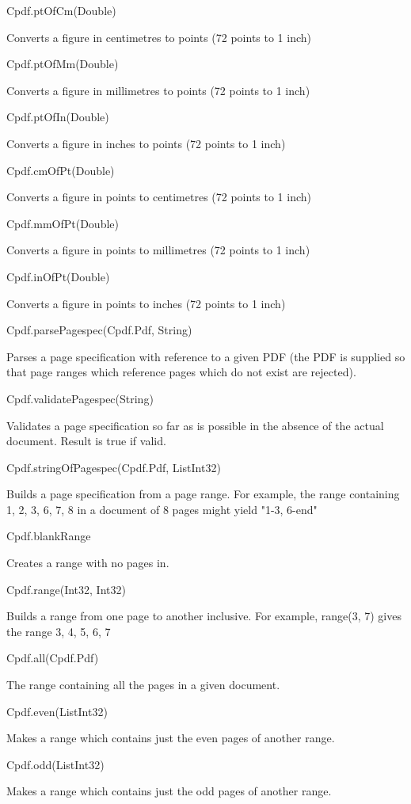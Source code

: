 Cpdf.ptOfCm(Double)

Converts a figure in centimetres to points (72 points to 1 inch)

Cpdf.ptOfMm(Double)

Converts a figure in millimetres to points (72 points to 1 inch)

Cpdf.ptOfIn(Double)

Converts a figure in inches to points (72 points to 1 inch)

Cpdf.cmOfPt(Double)

Converts a figure in points to centimetres (72 points to 1 inch)

Cpdf.mmOfPt(Double)

Converts a figure in points to millimetres (72 points to 1 inch)

Cpdf.inOfPt(Double)

Converts a figure in points to inches (72 points to 1 inch)

Cpdf.parsePagespec(Cpdf.Pdf, String)

Parses a page specification with reference
to a given PDF (the PDF is supplied so that page ranges which reference
pages which do not exist are rejected).

Cpdf.validatePagespec(String)

Validates a page specification so far as is
possible in the absence of the actual document. Result is true if valid.

Cpdf.stringOfPagespec(Cpdf.Pdf, List{Int32})

Builds a page specification from a page
range. For example, the range containing 1, 2, 3, 6, 7, 8 in a document of 8
pages might yield "1-3, 6-end"

Cpdf.blankRange

Creates a range with no pages in.

Cpdf.range(Int32, Int32)

Builds a range from one page to another inclusive. For
example, range(3, 7) gives the range 3, 4, 5, 6, 7

Cpdf.all(Cpdf.Pdf)

The range containing all the pages in a given document.

Cpdf.even(List{Int32})

Makes a range which contains just the even pages of
another range.

Cpdf.odd(List{Int32})

Makes a range which contains just the odd pages of another
range.

